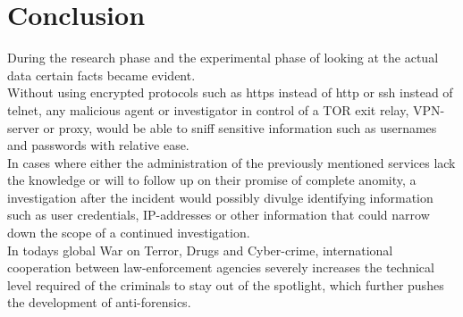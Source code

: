 \section{Conclusion}
\label{sec:conclusion}
%
During the research phase and the experimental phase of looking at the actual data certain facts became evident. \\

Without using encrypted protocols such as https instead of http or ssh instead of telnet, any malicious agent or investigator in control of a TOR exit relay, VPN-server or proxy, would be able to sniff sensitive information such as usernames and passwords with relative ease.\\

In cases where either the administration of the previously mentioned services lack the knowledge or will to follow up on their promise of complete anomity, a investigation after the incident would possibly divulge identifying information such as user credentials, IP-addresses or other information that could narrow down the scope of a continued investigation.\\

In todays global War on Terror, Drugs and Cyber-crime, international cooperation between law-enforcement agencies severely increases the technical level required of the criminals to stay out of the spotlight, which further pushes the development of anti-forensics.
